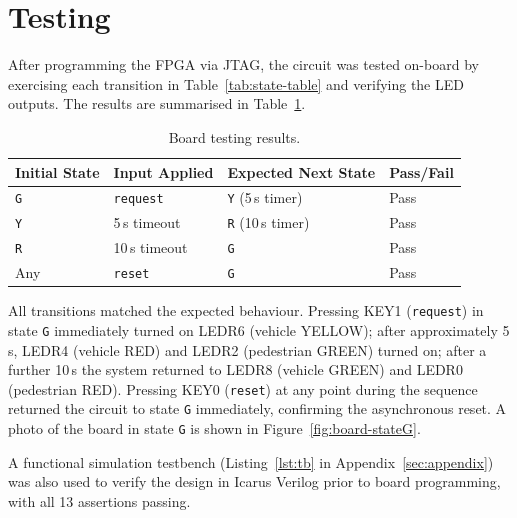 \documentclass[10pt,a4paper]{article}
\theoremstyle{definition} %
\begin{document}
\section{Testing}

After programming the FPGA via JTAG, the circuit was tested on-board by exercising each transition in Table~\ref{tab:state-table} and verifying the LED outputs. The results are summarised in Table~\ref{tab:testing}.

\begin{table}[htbp]
    \centering
    \caption{Board testing results.}
    \label{tab:testing}
    \begin{tabular}{llll}
        \toprule
        Initial State & Input Applied    & Expected Next State      & Pass/Fail \\
        \midrule
        \texttt{G}    & \texttt{request} & \texttt{Y} (5\,s timer)  & Pass      \\
        \texttt{Y}    & 5\,s timeout     & \texttt{R} (10\,s timer) & Pass      \\
        \texttt{R}    & 10\,s timeout    & \texttt{G}               & Pass      \\
        Any           & \texttt{reset}   & \texttt{G}               & Pass      \\
        \bottomrule
    \end{tabular}
\end{table}

All transitions matched the expected behaviour. Pressing KEY1 (\texttt{request}) in state \texttt{G} immediately turned on LEDR6 (vehicle YELLOW); after approximately 5\,s, LEDR4 (vehicle RED) and LEDR2 (pedestrian GREEN) turned on; after a further 10\,s the system returned to LEDR8 (vehicle GREEN) and LEDR0 (pedestrian RED). Pressing KEY0 (\texttt{reset}) at any point during the sequence returned the circuit to state \texttt{G} immediately, confirming the asynchronous reset. A photo of the board in state \texttt{G} is shown in Figure~\ref{fig:board-stateG}.

A functional simulation testbench (Listing~\ref{lst:tb} in Appendix~\ref{sec:appendix}) was also used to verify the design in Icarus Verilog prior to board programming, with all 13 assertions passing.

\end{document}
